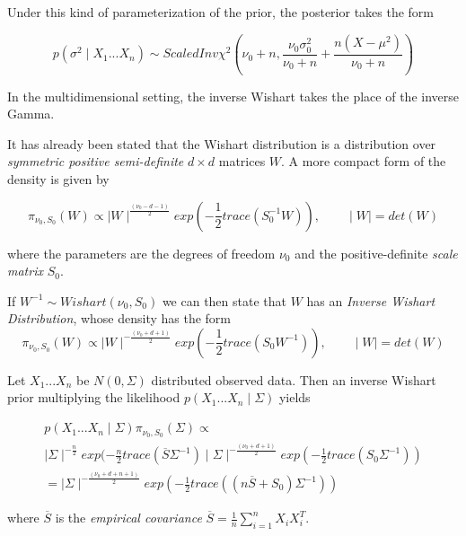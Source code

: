\documentclass[12pt,openright,twoside,a4paper]{book}
\begin{document}
Under this kind of parameterization of the prior, the posterior takes the form

\begin{equation}
p(\sigma^2 \mid X_1...X_n)\sim ScaledInv\chi^2(\nu_0+n, \frac{\nu_0 \sigma_0^2}{\nu_0 + n} + \frac{n(X-\mu^2)}{\nu_0 + n})
\end{equation}

In the multidimensional setting, the inverse Wishart takes the place of the inverse Gamma.

It has already been stated that the Wishart distribution is a distribution over \textit{symmetric positive semi-definite} $d\times d$ matrices $W$. A more compact form of the density is given by

\begin{equation}
\pi_{\nu_0, S_0}(W)\propto \mid W\mid ^{\frac{(\nu_0-d-1)}{2}}exp(-\frac{1}{2}trace(S_0^{-1}W)), \qquad \mid W\mid=det(W)
\end{equation}

where the parameters are the degrees of freedom $\nu_0$ and the positive-definite \textit{scale matrix}
$S_0$.

If $W^{-1}\sim Wishart(\nu_0, S_0)$ we can then state that $W$ has an \textit{Inverse Wishart Distribution}, whose density has the form
\begin{equation}
\pi_{\nu_0, S_0}(W)\propto \mid W\mid ^{-\frac{(\nu_0+d+1)}{2}}exp(-\frac{1}{2}trace(S_0W^{-1})), \qquad \mid W\mid=det(W)
\end{equation}

Let $X_1...X_n$ be $N(0,\Sigma)$ distributed observed data. Then an inverse Wishart prior multiplying the likelihood $p(X_1...X_n\mid \Sigma)$ yields

\begin{equation}
\begin{aligned}
p(X_1...X_n\mid \Sigma)\pi_{\nu_0, S_0}(\Sigma)\propto \\[10pt]
 \mid\Sigma \mid ^{-\frac{n}{2}}exp(-\frac{n}{2}trace(\overline{S} \Sigma^{-1}) \mid \Sigma\mid ^{-\frac{(\nu_0+d+1)}{2}}exp(-\frac{1}{2}trace(S_0\Sigma^{-1})) \\[10pt]  
=  \mid \Sigma\mid ^{-\frac{(\nu_0+d+n+1)}{2}}exp(-\frac{1}{2}trace((n\overline{S}+S_0)\Sigma^{-1}))
\end{aligned}
\end{equation}

where $\overline{S}$ is the \textit{empirical covariance} $\overline{S}=\frac{1}{n}\sum_{i=1}
^nX_iX_i^T$.
\end{document}
